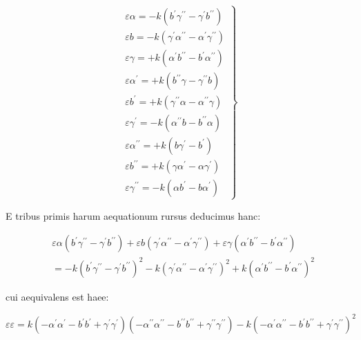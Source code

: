 \documentclass[10pt]{article}
\begin{document}
\[
\left.\begin{array}{l}
\varepsilon \alpha=-k\left(b^{\prime} \gamma^{\prime \prime}-\gamma^{\prime} b^{\prime \prime}\right) \\
\varepsilon b=-k\left(\gamma^{\prime} \alpha^{\prime \prime}-\alpha^{\prime} \gamma^{\prime \prime}\right) \\
\varepsilon \gamma=+k\left(\alpha^{\prime} b^{\prime \prime}-b^{\prime} \alpha^{\prime \prime}\right) \\
\varepsilon \alpha^{\prime}=+k\left(b^{\prime \prime} \gamma-\gamma^{\prime \prime} b\right) \\
\varepsilon b^{\prime}=+k\left(\gamma^{\prime \prime} \alpha-\alpha^{\prime \prime} \gamma\right) \\
\varepsilon \gamma^{\prime}=-k\left(\alpha^{\prime \prime} b-b^{\prime \prime} \alpha\right) \\
\varepsilon \alpha^{\prime \prime}=+k\left(b \gamma^{\prime}-b^{\prime}\right) \\
\varepsilon b^{\prime \prime}=+k\left(\gamma \alpha^{\prime}-\alpha \gamma^{\prime}\right) \\
\varepsilon \gamma^{\prime \prime}=-k\left(\alpha b^{\prime}-b \alpha^{\prime}\right)
\end{array}\right\}
\]

E tribus primis harum aequationum rursus deducimus hanc:

\[
\begin{aligned}
& \varepsilon \alpha\left(b^{\prime} \gamma^{\prime \prime}-\gamma^{\prime} b^{\prime \prime}\right)+\varepsilon b\left(\gamma^{\prime} \alpha^{\prime \prime}-\alpha^{\prime} \gamma^{\prime \prime}\right)+\varepsilon \gamma\left(\alpha^{\prime} b^{\prime \prime}-b^{\prime} \alpha^{\prime \prime}\right) \\
&=-k\left(b^{\prime} \gamma^{\prime \prime}-\gamma^{\prime} b^{\prime \prime}\right)^{2}-k\left(\gamma^{\prime} \alpha^{\prime \prime}-\alpha^{\prime} \gamma^{\prime \prime}\right)^{2}+k\left(\alpha^{\prime} b^{\prime \prime}-b^{\prime} \alpha^{\prime \prime}\right)^{2}
\end{aligned}
\]

cui aequivalens est haee:

\[
\varepsilon \varepsilon=k\left(-\alpha^{\prime} \alpha^{\prime}-b^{\prime} b^{\prime}+\gamma^{\prime} \gamma^{\prime}\right)\left(-\alpha^{\prime \prime} \alpha^{\prime \prime}-b^{\prime \prime} b^{\prime \prime}+\gamma^{\prime \prime} \gamma^{\prime \prime}\right)-k\left(-\alpha^{\prime} \alpha^{\prime \prime}-b^{\prime} b^{\prime \prime}+\gamma^{\prime} \gamma^{\prime \prime}\right)^{2}
\]
\end{document}
